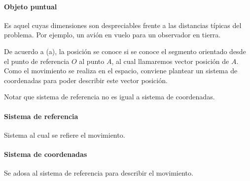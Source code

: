 \paragraph{Objeto puntual}
Es aquel cuyas dimensiones son despreciables frente a las distancias típicas del problema. Por 
ejemplo, un avión en vuelo para un observador en tierra.

\para
De acuerdo a (a), la posición se conoce si se conoce el segmento orientado desde el punto de referencia $O$ al punto 
$A$, al cual llamaremos vector posición de $A$. Como el movimiento se realiza en el espacio, conviene plantear un 
sistema de coordenadas para poder describir este vector posición.

\para
Notar que sistema de referencia no es igual a sistema de coordenadas. 

\paragraph{Sistema de referencia}
Sistema al cual se refiere el movimiento.

\paragraph{Sistema de coordenadas}
Se adosa al sistema de referencia para describir el movimiento.

